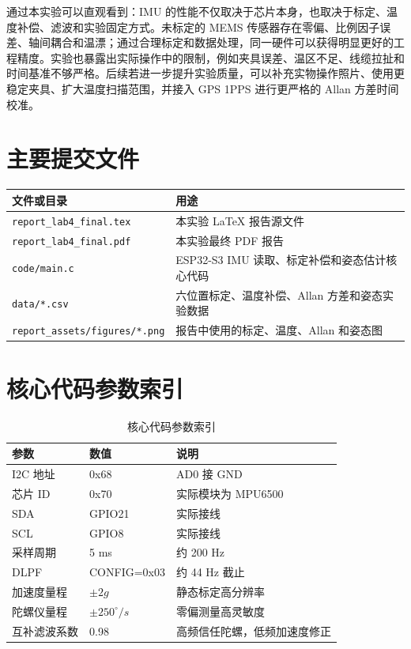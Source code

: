 \documentclass[UTF8,a4paper,12pt]{ctexart}
\newcommand{\code}[1]{\texttt{#1}}
\begin{document}
通过本实验可以直观看到：IMU 的性能不仅取决于芯片本身，也取决于标定、温度补偿、滤波和实验固定方式。未标定的 MEMS 传感器存在零偏、比例因子误差、轴间耦合和温漂；通过合理标定和数据处理，同一硬件可以获得明显更好的工程精度。实验也暴露出实际操作中的限制，例如夹具误差、温区不足、线缆拉扯和时间基准不够严格。后续若进一步提升实验质量，可以补充实物操作照片、使用更稳定夹具、扩大温度扫描范围，并接入 GPS 1PPS 进行更严格的 Allan 方差时间校准。

\appendix
\section{主要提交文件}
\begin{longtable}{p{}p{}}
\toprule
文件或目录 & 用途\\
\midrule
\code{report\_lab4\_final.tex} & 本实验 LaTeX 报告源文件\\
\code{report\_lab4\_final.pdf} & 本实验最终 PDF 报告\\
\code{code/main.c} & ESP32-S3 IMU 读取、标定补偿和姿态估计核心代码\\
\code{data/*.csv} & 六位置标定、温度补偿、Allan 方差和姿态实验数据\\
\code{report\_assets/figures/*.png} & 报告中使用的标定、温度、Allan 和姿态图\\
\bottomrule
\end{longtable}

\section{核心代码参数索引}
\begin{table}[H]
\centering
\caption{核心代码参数索引}
\begin{tabular}{lll}
\toprule
参数 & 数值 & 说明\\
\midrule
I2C 地址 & 0x68 & AD0 接 GND\\
芯片 ID & 0x70 & 实际模块为 MPU6500\\
SDA & GPIO21 & 实际接线\\
SCL & GPIO8 & 实际接线\\
采样周期 & 5 ms & 约 200 Hz\\
DLPF & CONFIG=0x03 & 约 44 Hz 截止\\
加速度量程 & \(\pm 2g\) & 静态标定高分辨率\\
陀螺仪量程 & \(\pm 250^\circ/s\) & 零偏测量高灵敏度\\
互补滤波系数 & 0.98 & 高频信任陀螺，低频加速度修正\\
\bottomrule
\end{tabular}
\end{table}
\end{document}
